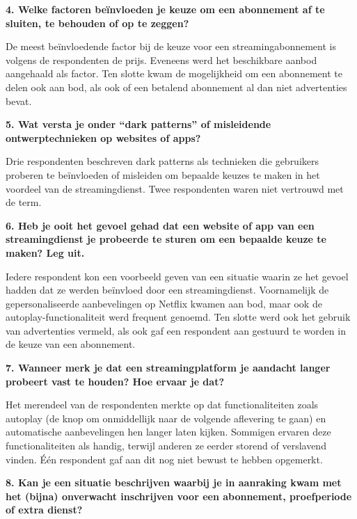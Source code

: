 \vspace{1em}

\textbf{4. Welke factoren beïnvloeden je keuze om een abonnement af te sluiten, te behouden of op te zeggen?}

De meest beïnvloedende factor bij de keuze voor een streamingabonnement is volgens de respondenten de prijs. Eveneens werd het beschikbare aanbod aangehaald als factor. Ten slotte kwam de mogelijkheid om een abonnement te delen ook aan bod, als ook of een betalend abonnement al dan niet advertenties bevat.

\vspace{1em}

\textbf{5. Wat versta je onder “dark patterns” of misleidende ontwerptechnieken op websites of apps?}

Drie respondenten beschreven dark patterns als technieken die gebruikers proberen te beïnvloeden of misleiden om bepaalde keuzes te maken in het voordeel van de streamingdienst. Twee respondenten waren niet vertrouwd met de term.

\vspace{1em}

\textbf{6. Heb je ooit het gevoel gehad dat een website of app van een streamingdienst je probeerde te sturen om een bepaalde keuze te maken? Leg uit.}

Iedere respondent kon een voorbeeld geven van een situatie waarin ze het gevoel hadden dat ze werden beïnvloed door een streamingdienst. Voornamelijk de gepersonaliseerde aanbevelingen op Netflix kwamen aan bod, maar ook de autoplay-functionaliteit werd frequent genoemd. Ten slotte werd ook het gebruik van advertenties vermeld, als ook gaf een respondent aan gestuurd te worden in de keuze van een abonnement. 

\vspace{1em}

\textbf{7. Wanneer merk je dat een streamingplatform je aandacht langer probeert vast te houden? Hoe ervaar je dat?}

Het merendeel van de respondenten merkte op dat functionaliteiten zoals autoplay (de knop om onmiddellijk naar de volgende aflevering te gaan) en automatische aanbevelingen hen langer laten kijken. Sommigen ervaren deze functionaliteiten als handig, terwijl anderen ze eerder storend of verslavend vinden. Één respondent gaf aan dit nog niet bewust te hebben opgemerkt.

\newpage

\textbf{8. Kan je een situatie beschrijven waarbij je in aanraking kwam met het (bijna) onverwacht inschrijven voor een abonnement, proefperiode of extra dienst?}

